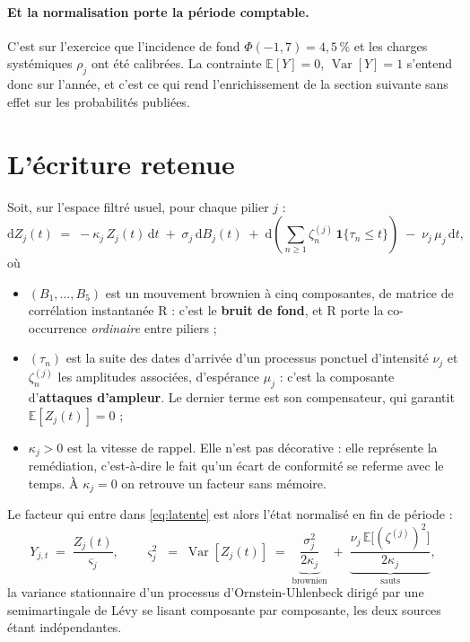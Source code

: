 \documentclass[11pt,a4paper]{article}
\newcommand{\Var}{\operatorname{Var}}
\newcommand{\E}{\mathbb{E}}
\begin{document}
\paragraph{Et la normalisation porte la période comptable.} C'est sur l'exercice que
l'incidence de fond $\Phi(-1{,}7) = 4{,}5\,\%$ et les charges systémiques $\rho_j$ ont été
calibrées. La contrainte $\E[Y] = 0$, $\Var[Y] = 1$ s'entend donc sur l'année, et c'est ce
qui rend l'enrichissement de la section suivante sans effet sur les probabilités publiées.

\section{L'écriture retenue}

Soit, sur l'espace filtré usuel, pour chaque pilier $j$ :
\begin{equation}
\label{eq:sde}
  \mathrm{d}Z_j(t) \;=\; -\kappa_j\,Z_j(t)\,\mathrm{d}t
  \;+\; \sigma_j\,\mathrm{d}B_j(t)
  \;+\; \mathrm{d}\!\left(\sum_{n\geq 1} \zeta^{(j)}_n\,
        \mathbf 1\{\tau_n \leq t\}\right)
  \;-\; \nu_j\,\mu_j\,\mathrm{d}t ,
\end{equation}
où
\begin{itemize}[itemsep=2pt,topsep=3pt]
\item $(B_1,\dots,B_5)$ est un mouvement brownien à cinq composantes, de matrice de
      corrélation instantanée $\mathrm{R}$ : c'est le \textbf{bruit de fond}, et
      $\mathrm{R}$ porte la co-occurrence \emph{ordinaire} entre piliers ;
\item $(\tau_n)$ est la suite des dates d'arrivée d'un processus ponctuel d'intensité
      $\nu_j$ et $\zeta^{(j)}_n$ les amplitudes associées, d'espérance $\mu_j$ : c'est la
      composante d'\textbf{attaques d'ampleur}. Le dernier terme est son compensateur, qui
      garantit $\E[Z_j(t)] = 0$ ;
\item $\kappa_j > 0$ est la vitesse de rappel. Elle n'est pas décorative : elle représente
      la remédiation, c'est-à-dire le fait qu'un écart de conformité se referme avec le
      temps. À $\kappa_j = 0$ on retrouve un facteur sans mémoire.
\end{itemize}

Le facteur qui entre dans \eqref{eq:latente} est alors l'état normalisé en fin de période :
\begin{equation}
\label{eq:norm}
  Y_{j,t} \;=\; \frac{Z_j(t)}{\varsigma_j},
  \qquad
  \varsigma_j^2 \;=\; \Var\!\left[Z_j(t)\right]
  \;=\; \underbrace{\frac{\sigma_j^2}{2\kappa_j}}_{\text{brownien}}
  \;+\; \underbrace{\frac{\nu_j\,\E\big[(\zeta^{(j)})^2\big]}{2\kappa_j}}_{\text{sauts}} ,
\end{equation}
la variance stationnaire d'un processus d'Ornstein-Uhlenbeck dirigé par une semimartingale
de Lévy se lisant composante par composante, les deux sources étant indépendantes.
\end{document}
